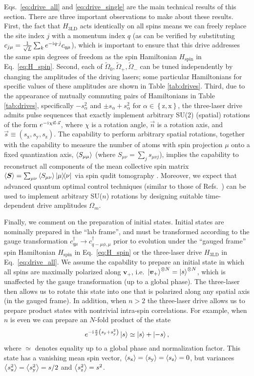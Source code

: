 \documentclass[nofootinbib,twocolumn]{revtex4-2}
\renewcommand{\t}{\text} %
\newcommand{\p}[1]{\left(#1\right)} %
\renewcommand{\set}[1]{\left\{#1\right\}} %
\newcommand{\bk}{\Braket} %
\renewcommand{\v}{\bm} %
\renewcommand{\c}{\cdot} %
\renewcommand{\i}{\mathrm{i}\mkern1mu} %
\newcommand{\1}{\mathds{1}}
\newcommand{\x}{\text{x}}
\newcommand{\y}{\text{y}}
\newcommand{\z}{\text{z}}
\begin{document}
Eqs.~\eqref{eq:drive_all} and \eqref{eq:drive_single} are the main technical results of this section.
There are three important observations to make about these results.
First, the fact that $H_{\t{3LD}}$ acts identically on all spins means we can freely replace the site index $j$ with a momentum index $q$ (as can be verified by substituting $c_{j\mu}=\frac1{\sqrt{L}}\sum_k e^{-\i q\c j} c_{q\mu}$), which is important to ensure that this drive addresses the same spin degrees of freedom as the spin Hamiltonian $H_{\t{spin}}$ in Eq.~\eqref{eq:H_spin}.
Second, each of $\tilde\Omega_0,\tilde\Omega_+,\tilde\Omega_-$ can be tuned independently by changing the amplitudes of the driving lasers; some particular Hamiltonians for specific values of these amplitudes are shown in Table \ref{tab:drives}.
Third, due to the appearance of mutually commuting pairs of Hamiltonians in Table \ref{tab:drives}, specifically $-s_\alpha^2$ and $\pm s_\alpha+s_\alpha^2$ for $\alpha\in\set{\z,\x}$, the three-laser drive admits pulse sequences that exactly implement arbitrary SU(2) (spatial) rotations of the form $e^{-\i\chi\vec n\c\vec s}$, where $\chi$ is a rotation angle, $\vec n$ is a rotation axis, and $\vec s\equiv(s_\x,s_\y,s_\z)$.
The capability to perform arbitrary spatial rotations, together with the capability to measure the number of atoms with spin projection $\mu$ onto a fixed quantization axis, $\bk{S_{\mu\mu}}$ (where $S_{\mu\nu}=\sum_js_{\mu\nu j}$), implies the capability to reconstruct all components of the mean collective spin matrix $\bk{\v S}=\sum_{\mu\nu}\bk{S_{\mu\nu}}\op{\mu}{\nu}$ via spin qudit tomography \cite{newton1968measurability, perlin2020qudit}.
Moreover, we expect that advanced quantum optimal control techniques (similar to those of Refs.~\cite{anderson2015accurate, lucarelli2018quantum}) can be used to implement arbitrary SU($n$) rotations by designing suitable time-dependent drive amplitudes $\Omega_m$.

Finally, we comment on the preparation of initial states.
Initial states are nominally prepared in the ``lab frame'', and must be transformed according to the gauge transformation $c_{q\mu}^\dag\to c_{q-\mu\phi,\mu}^\dag$ prior to evolution under the ``gauged frame'' spin Hamiltonian $H_{\t{spin}}$ in Eq.~\eqref{eq:H_spin} or the three-laser drive $H_{\t{3LD}}$ in Eq.~\eqref{eq:drive_all}.
We assume the capability to prepare an initial state in which all spins are maximally polarized along $\v v_+$, i.e.~$\ket{\v v_+}^{\otimes N}=\ket{s}^{\otimes N}$, which is unaffected by the gauge transformation (up to a global phase).
The three-laser then allows us to rotate this state into one that is polarized along any spatial axis (in the gauged frame).
In addition, when $n>2$ the three-laser drive allows us to prepare product states with nontrivial intra-spin correlations.
For example, when $n$ is even we can prepare an $N$-fold product of the state
\begin{align}
  e^{-\i\frac{\pi}{2}\p{s_\y+s_\y^2}} \ket{s} \simeq \ket{s} + \ket{-s},
\end{align}
where $\simeq$ denotes equality up to a global phase and normalization factor.
This state has a vanishing mean spin vector, $\bk{s_\x}=\bk{s_\y}=\bk{s_\z}=0$, but variances $\bk{s_\x^2}=\bk{s_\y^2}=s/2$ and $\bk{s_\z^2}=s^2$.
\end{document}
